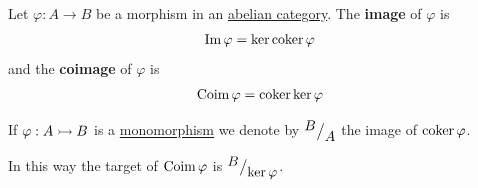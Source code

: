 \documentclass[../../../main]{subfiles}
\begin{document}
\begin{definition} \label{def:image-coimage}
  Let \(\varphi: A \to B\) be a morphism in an \hyperref[def:abelian-category]{abelian category}.
  The \textbf{image} of \(\varphi\) is
  \begin{align*}
    \operatorname*{Im} \varphi = \ker \operatorname*{coker} \varphi
  \end{align*}
  and the \textbf{coimage} of \(\varphi\) is
  \begin{align*}
    \operatorname*{Coim} \varphi = \operatorname*{coker} \ker \varphi
  \end{align*}
\end{definition}

\begin{notation}
  If \(\varphi: A \rightarrowtail B\) is a \hyperref[def:mono-epi-morphism]{monomorphism} we denote by \({^{\textstyle B}\big/_{\textstyle A}}\) the image of \(\operatorname*{coker} \varphi\).

  In this way the target of \(\operatorname*{Coim} \varphi\) is \({^{\textstyle B}\big/_{\textstyle \ker \varphi}}\).
\end{notation}
\end{document}
